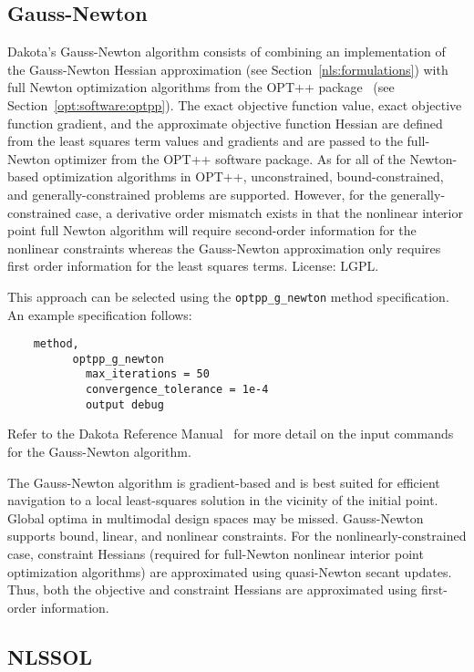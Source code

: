 \subsection{Gauss-Newton}\label{nls:solution:gauss}

Dakota's Gauss-Newton algorithm consists of combining an
implementation of the Gauss-Newton Hessian approximation (see
Section~\ref{nls:formulations}) with full Newton optimization
algorithms from the OPT++ package~\cite{MeOlHoWi07} (see
Section~\ref{opt:software:optpp}). The exact objective function
value, exact objective function gradient, and the approximate
objective function Hessian are defined from the least squares term
values and gradients and are passed to the full-Newton optimizer from
the OPT++ software package. As for all of the Newton-based
optimization algorithms in OPT++, unconstrained, bound-constrained,
and generally-constrained problems are supported. However, for the
generally-constrained case, a derivative order mismatch exists in that
the nonlinear interior point full Newton algorithm will require
second-order information for the nonlinear constraints whereas the
Gauss-Newton approximation only requires first order information for
the least squares terms. License: LGPL.

This approach can be selected using
the \texttt{optpp\_g\_newton} method specification. An example
specification follows:
\begin{small}
\begin{verbatim}
    method,
          optpp_g_newton
            max_iterations = 50
            convergence_tolerance = 1e-4
            output debug
\end{verbatim}
\end{small}

Refer to the Dakota Reference Manual~\cite{RefMan} for more detail on the
input commands for the Gauss-Newton algorithm.

The Gauss-Newton algorithm is gradient-based and is best suited for
efficient navigation to a local least-squares solution in the vicinity
of the initial point. Global optima in multimodal design spaces may be
missed. Gauss-Newton supports bound, linear, and nonlinear
constraints. For the nonlinearly-constrained case, constraint Hessians
(required for full-Newton nonlinear interior point optimization
algorithms) are approximated using quasi-Newton secant updates. Thus,
both the objective and constraint Hessians are approximated using
first-order information.

\subsection{NLSSOL}\label{nls:solution:nlssol}

